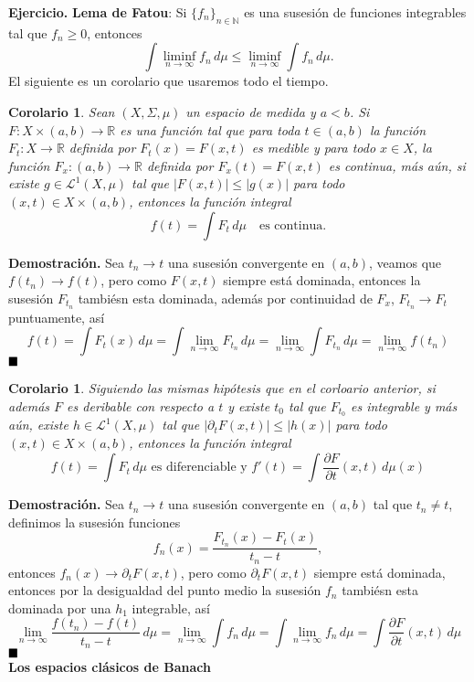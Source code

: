 \documentclass[letterpaper]{book}
\newtheorem{cor}[teorema]{Corolario}
\newcommand{\nat}{\ensuremath{ \mathbb N }}
\newcommand{\exe}{{\noindent \sc \textbf{Ejercicio. }}}
\newcommand{\dem}{{\noindent \sc \textbf{Demostraci\'on. }}}
\newcommand{\QED}{\ensuremath{\hspace*{0em plus 1fill}\blacksquare}}
\newcommand{\sig}{\ensuremath{\Sigma}}
\newcommand{\re}{\ensuremath{\mathbb R }}
\begin{document}
\exe\textbf{Lema de Fatou}: Si $\{f_n\}_{n\in\nat}$ es una susesión de funciones integrables tal que $f_n \geq 0$, entonces
\[
\int \liminf_{n \to \infty} f_n \, d\mu \leq \liminf_{n \to \infty} \int f_n \, d\mu.
\]
El siguiente es un corolario que usaremos todo el tiempo.
\begin{cor}
  Sean $(X,\sig,\mu)$ un espacio de medida y $a<b$. Si $F:X\times(a,b)\to\re$ es una función tal que para toda $t\in(a,b)$ la función $F_t:X\to\re$ definida por $F_t(x)=F(x,t)$ es medible y para todo $x\in X$, la función $F_x:(a,b)\to\re$ definida por $F_x(t)=F(x,t)$ es continua, más aún, si existe $g\in\mathcal{L}^1(X,\mu)$ tal que $|F(x,t)|\leq|g(x)|$ para todo $(x,t)\in X\times(a,b)$, entonces la función integral
\begin{equation}
  f(t)=\int F_t\,d\mu\quad\text{es continua.}
  \end{equation}
\end{cor}
\dem Sea $t_n\to t$ una susesión convergente en $(a,b)$, veamos que $f(t_n)\to f(t)$, pero como $F(x,t)$ siempre está dominada, entonces la susesión $F_{t_n}$ tambiésn esta dominada, además por continuidad de $F_x$, $F_{t_n}\to F_t$ puntuamente, así
\[
f(t)=\int F_t(x)\,d\mu=\int\lim_{n\to\infty}F_{t_n}\,d\mu=\lim_{n\to\infty}\int F_{t_n}\,d\mu=\lim_{n\to\infty}f(t_n)
\]
\QED\\
\begin{cor}
Siguiendo las mismas hipótesis que en el corloario anterior, si además $F$ es deribable con respecto a $t$ y existe $t_0$ tal que $F_{t_0}$ es integrable y más aún, existe $h\in\mathcal{L}^1(X,\mu)$ tal que $|\partial_t F(x,t)|\leq|h(x)|$ para todo $(x,t)\in X\times(a,b)$, entonces la función integral
\begin{equation}
  f(t)=\int F_t\,d\mu\text{ es diferenciable y } f'(t)=\int \dfrac{\partial F}{\partial t}(x,t)\,d\mu(x)
  \end{equation}
\end{cor}
\dem Sea $t_n\to t$ una susesión convergente en $(a,b)$ tal que $t_n\neq t$, definimos la susesión funciones
\[
f_n(x)=\frac{F_{t_n}(x)-F_t(x)}{t_n-t},
\]
entonces $f_n(x)\to\partial_tF(x,t)$, pero como $\partial_t F(x,t)$ siempre está dominada, entonces por la desigualdad del punto medio la susesión $f_{n}$ tambiésn esta dominada por una $h_1$ integrable, así
\[
\lim_{n\to\infty}\frac{f(t_n)-f(t)}{t_n-t}\,d\mu=\lim_{n\to\infty}\int f_{n}\,d\mu=\int\lim_{n\to\infty}f_{n}\,d\mu=\int \dfrac{\partial F}{\partial t}(x,t)\,d\mu
\]
\QED\\
\noindent\textbf{Los espacios clásicos de Banach}
\end{document}
